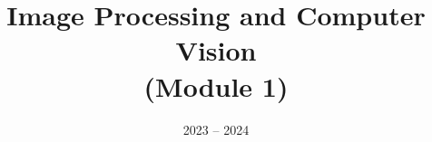 \documentclass[11pt]{ainotes}
\title{Image Processing and Computer Vision\\(Module 1)}
\date{2023 -- 2024}
\begin{document}
    
    \makenotesfront

    
    
    
\end{document}

